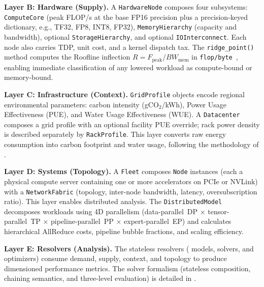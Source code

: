 \documentclass[10pt,twocolumn]{article}
\begin{document}
\textbf{Layer B: Hardware (Supply).} A \texttt{HardwareNode} composes four subsystems: \texttt{ComputeCore} (peak FLOP/s at the base FP16 precision plus a precision-keyed dictionary, e.g., TF32, FP8, INT8, FP32), \texttt{MemoryHierarchy} (capacity and bandwidth), optional \texttt{StorageHierarchy}, and optional \texttt{IOInterconnect}. Each node also carries TDP, unit cost, and a kernel dispatch tax. The \texttt{ridge\_point()} method computes the Roofline inflection $R = F_{\text{peak}} / BW_{\text{mem}}$ in \texttt{flop/byte}~\citep{williams2009}, enabling immediate classification of any lowered workload as compute-bound or memory-bound.

\textbf{Layer C: Infrastructure (Context).} \texttt{GridProfile} objects encode regional environmental parameters: carbon intensity (gCO$_2$/kWh), Power Usage Effectiveness (PUE), and Water Usage Effectiveness (WUE). A \texttt{Datacenter} composes a grid profile with an optional facility PUE override; rack power density is described separately by \texttt{RackProfile}. This layer converts raw energy consumption into carbon footprint and water usage, following the methodology of \citet{patterson2021carbon}.

\textbf{Layer D: Systems (Topology).} A \texttt{Fleet} composes \texttt{Node} instances (each a physical compute server containing one or more accelerators on PCIe or NVLink) with a \texttt{NetworkFabric} (topology, inter-node bandwidth, latency, oversubscription ratio). This layer enables distributed analysis. The \texttt{DistributedModel} decomposes workloads using 4D parallelism (data-parallel~DP $\times$ tensor-parallel~TP $\times$ pipeline-parallel~PP $\times$ expert-parallel~EP) and calculates hierarchical AllReduce costs, pipeline bubble fractions, and scaling efficiency.

\textbf{Layer E: Resolvers (Analysis).} The \CountResolvers{} stateless resolvers (\CountResolverModels{} models, \CountResolverSolvers{} solvers, and \CountResolverOptimizers{} optimizers) consume demand, supply, context, and topology to produce dimensioned performance metrics. The solver formalism (stateless composition, chaining semantics, and three-level evaluation) is detailed in .
\end{document}
